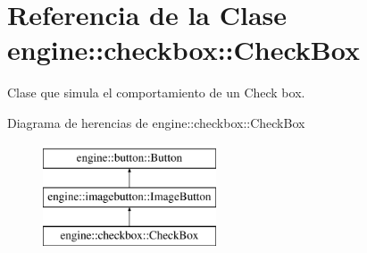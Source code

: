 \hypertarget{classengine_1_1checkbox_1_1CheckBox}{
\section{\-Referencia de la \-Clase engine\-:\-:checkbox\-:\-:\-Check\-Box}
\label{classengine_1_1checkbox_1_1CheckBox}
}


\-Clase que simula el comportamiento de un \-Check box.  


\-Diagrama de herencias de engine\-:\-:checkbox\-:\-:\-Check\-Box\begin{figure}[H]
\begin{center}
\leavevmode
\includegraphics[height=3.000000cm]{classengine_1_1checkbox_1_1CheckBox}
\end{center}
\end{figure}
